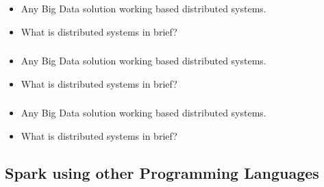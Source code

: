 \begin{frame}
  \frametitle{\subsecname}
	\begin{itemize} 
		\item Any Big Data solution working based distributed systems.
		\item What is distributed systems in brief?
	\end{itemize}
\end{frame}




\begin{frame}
  \frametitle{\subsecname}
	\begin{itemize} 
		\item Any Big Data solution working based distributed systems.
		\item What is distributed systems in brief?
	\end{itemize}
\end{frame}




\begin{frame}
  \frametitle{\subsecname}
	\begin{itemize} 
		\item Any Big Data solution working based distributed systems.
		\item What is distributed systems in brief?
	\end{itemize}
\end{frame}


\subsection{Spark using other Programming Languages}


